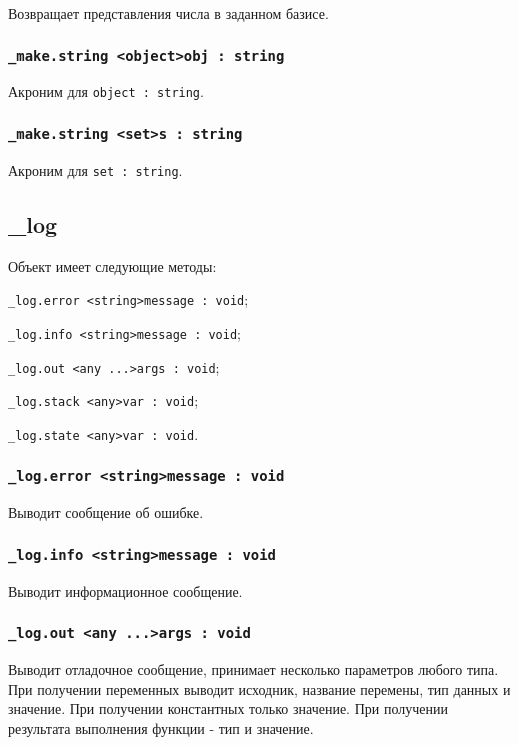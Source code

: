 Возвращает представления числа в заданном базисе.

\subsubsection{\lstinline|_make.string <object>obj : string|}

Акроним для \lstinline|object : string|.

\subsubsection{\lstinline|_make.string <set>s : string|}

Акроним для \lstinline|set : string|.

\subsection{{\color{orange} \_log}}

Объект \logtype{} имеет следующие методы:
\begin{icItems}
	\item \lstinline|_log.error <string>message : void|;
	\item \lstinline|_log.info <string>message : void|;
	\item \lstinline|_log.out <any ...>args : void|;
	\item \lstinline|_log.stack <any>var : void|;
	\item \lstinline|_log.state <any>var : void|.
\end{icItems}

\subsubsection{\lstinline|_log.error <string>message : void|}

Выводит сообщение об ошибке.

\subsubsection{\lstinline|_log.info <string>message : void|}

Выводит информационное сообщение.

\subsubsection{\lstinline|_log.out <any ...>args : void|}

Выводит отладочное сообщение, принимает несколько параметров любого типа. При получении переменных выводит исходник, название перемены, тип данных и значение. При получении константных только значение. При получении результата выполнения функции - тип и значение. 

